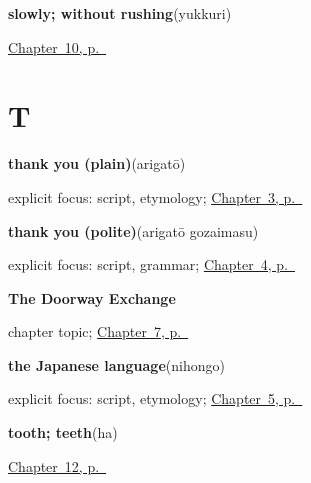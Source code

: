 \noindent\begin{minipage}[t]{\linewidth}
\raggedright
\textbf{slowly; without rushing}\enspace\emph{}\enspace(yukkuri)\par
\footnotesize \hyperref[ch:ja-slower-please]{Chapter~10, p.~\pageref*{ch:ja-slower-please}}
\end{minipage}\par\smallskip

\section*{T}

\noindent\begin{minipage}[t]{\linewidth}
\raggedright
\textbf{thank you (plain)}\enspace\emph{}\enspace(arigatō)\par
\footnotesize explicit focus: script, etymology; \hyperref[ch:ja-plain-thanks]{Chapter~3, p.~\pageref*{ch:ja-plain-thanks}}
\end{minipage}\par\smallskip

\noindent\begin{minipage}[t]{\linewidth}
\raggedright
\textbf{thank you (polite)}\enspace\emph{}\enspace(arigatō gozaimasu)\par
\footnotesize explicit focus: script, grammar; \hyperref[ch:ja-polite-thanks]{Chapter~4, p.~\pageref*{ch:ja-polite-thanks}}
\end{minipage}\par\smallskip

\noindent\begin{minipage}[t]{\linewidth}
\raggedright
\textbf{The Doorway Exchange}\par
\footnotesize chapter topic; \hyperref[ch:ja-doorway-exchange]{Chapter~7, p.~\pageref*{ch:ja-doorway-exchange}}
\end{minipage}\par\smallskip

\noindent\begin{minipage}[t]{\linewidth}
\raggedright
\textbf{the Japanese language}\enspace\emph{}\enspace(nihongo)\par
\footnotesize explicit focus: script, etymology; \hyperref[ch:ja-nihongo-kanji]{Chapter~5, p.~\pageref*{ch:ja-nihongo-kanji}}
\end{minipage}\par\smallskip

\noindent\begin{minipage}[t]{\linewidth}
\raggedright
\textbf{tooth; teeth}\enspace\emph{}\enspace(ha)\par
\footnotesize \hyperref[ch:ja-body-seven-more]{Chapter~12, p.~\pageref*{ch:ja-body-seven-more}}
\end{minipage}\par\smallskip

